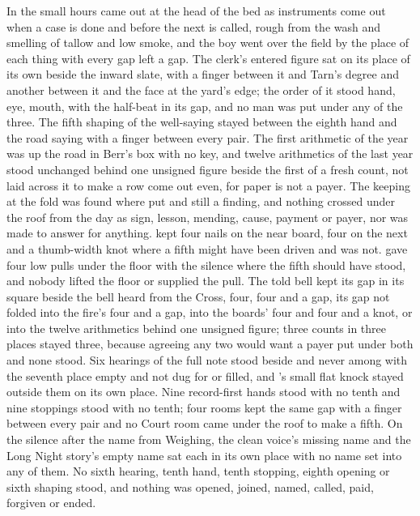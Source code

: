 In the small hours  came out at the head of the bed as instruments come out when a case is done and before the next is called, rough from the wash and smelling of tallow and low smoke, and the boy went over the field by the place of each thing with every gap left a gap. The clerk's entered figure sat on its place of its own beside the inward slate, with a finger between it and Tarn's degree and another between it and the face at the yard's edge; the order of it stood hand, eye, mouth, with the half-beat in its gap, and no man was put under any of the three. The fifth shaping of the well-saying stayed between the eighth hand and the road saying with a finger between every pair. The first arithmetic of the year was up the road in Berr's box with no key, and twelve arithmetics of the last year stood unchanged behind one unsigned figure beside the first of a fresh count, not laid across it to make a row come out even, for paper is not a payer. The keeping at the fold was found where put and still a finding, and nothing crossed under the roof from the day as sign, lesson, mending, cause, payment or payer, nor was made to answer for anything.  kept four nails on the near board, four on the next and a thumb-width knot where a fifth might have been driven and was not.  gave four low pulls under the floor with the silence where the fifth should have stood, and nobody lifted the floor or supplied the pull. The told bell kept its gap in its square beside the bell heard from the Cross, four, four and a gap, its gap not folded into the fire's four and a gap, into the boards' four and four and a knot, or into the twelve arithmetics behind one unsigned figure; three counts in three places stayed three, because agreeing any two would want a payer put under both and none stood. Six hearings of the full note stood beside and never among with the seventh place empty and not dug for or filled, and 's small flat knock stayed outside them on its own place. Nine record-first hands stood with no tenth and nine stoppings stood with no tenth; four rooms kept the same gap with a finger between every pair and no Court room came under the roof to make a fifth. On  the silence after the name from Weighing, the clean voice's missing name and the Long Night story's empty name sat each in its own place with no name set into any of them. No sixth hearing, tenth hand, tenth stopping, eighth opening or sixth shaping stood, and nothing was opened, joined, named, called, paid, forgiven or ended.


